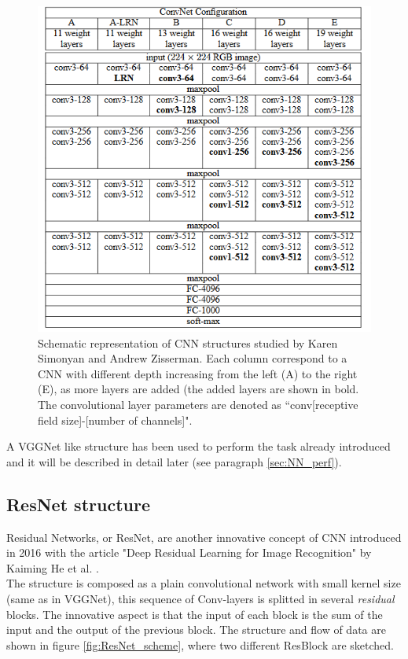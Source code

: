 \begin{figure}
	\centering
	\includegraphics[width=.8\textwidth]{IMG/Cap6/VGG_art.png}
	\caption{Schematic representation of CNN structures studied by Karen Simonyan and Andrew Zisserman. Each column correspond to a CNN with different depth increasing from the left (A) to the right (E), as more layers are added (the added layers are shown in bold. The convolutional layer parameters are denoted as “conv[receptive field size]-[number of channels]".}
	\label{fig:VGG_table}
\end{figure}

A VGGNet like structure has been used to perform the task already introduced and it will be described in detail later (see paragraph \ref{sec:NN_perf}).

\subsection*{ResNet structure} \label{subsec:ResNet_teo}
Residual Networks, or ResNet, are another innovative concept of CNN introduced in 2016 with the article "Deep Residual Learning for Image Recognition" by Kaiming He et al. \cite{ResNetArt}.\\
The structure is composed as a plain convolutional network with small kernel size (same as in VGGNet), this sequence of Conv-layers is splitted in several \textit{residual} blocks. The innovative aspect is that the input of each block is the sum of the input and the output of the previous block. The structure and flow of data are shown in figure \ref{fig:ResNet_scheme}, where two different ResBlock are sketched.\\

